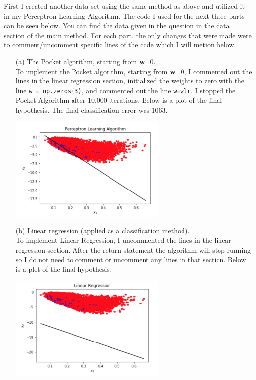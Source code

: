 \documentclass[a4paper]{article}
\begin{document}
First I created another data set using the same method as above and utilized it in my Perceptron 
Learning Algorithm.  The code I used for the next three parts can be seen below.  You can find the 
data given in the question in the data section of the main method.  For each part, the only changes 
that were made were to comment/uncomment specific lines of the code which I will metion below.

\begin{itemize}
    \item[(a)] The Pocket algorithm, starting from \textbf{w}=0.\\
    To implement the Pocket algorithm, starting from \textbf{w}=0, I commented out the lines in the 
    linear regression section, initialized the weights to zero with the line \verb|w = np.zeros(3)|, and 
    commented out the line \verb|w=wlr|.  I stopped the Pocket Algorithm after 10,000 iterations.  Below 
    is a plot of the final hypothesis.  The final classification error was 1063.
    \begin{center}
        \includegraphics[width=0.6\textwidth]{a-Pocket.jpg}
    \end{center}
    \item[(b)] Linear regression (applied as a classification method).\\
    To implement Linear Regression, I uncommented the lines in the linear regression section.  
    After the return statement the algorithm will stop running so I do not need to comment or 
    uncomment any lines in that section.  Below is a plot of the final hypothesis.
    \begin{center}
        \includegraphics[width=0.6\textwidth]{b-LinReg.jpg}

\end{center}
\end{itemize}
\end{document}
